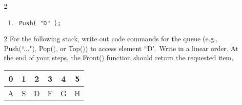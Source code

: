 \documentclass[a4paper,12pt,oneside]{book}
\newcounter{question}
\begin{document}
\begin{question}{\thequestion}{2}
\begin{enumerate}
                \item   \begin{verbatim} Push( "D" ); \end{verbatim}
                
            \end{enumerate}
        \end{question}
        
        \begin{question}{\thequestion}{2}
            For the following stack, write out code commands for the queue
            (e.g., Push(``..."), Pop(), or Top()) to access element ``D". Write in a linear
            order. At the end of your steps, the Front() function should return
            the requested item.

            \begin{center}
                \begin{tabular}{ | c | c | c | c | c | c | }
                    \hline
                    0 & 1 & 2 & 3 & 4 & 5
                    \\ \hline
                    A & S & D & F & G & H
                    \\ \hline
                \end{tabular}
            \end{center}

        \end{question}
\end{document}
